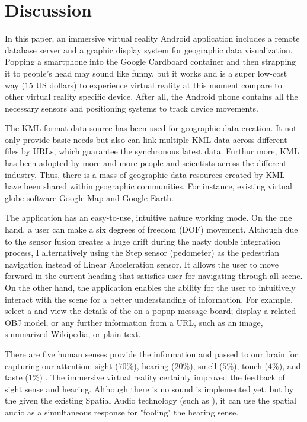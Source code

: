 \label{chapter-discussion}
\chapter{Discussion}

In this paper, an immersive virtual reality Android application includes a remote database server and a graphic display system for geographic data visualization. Popping a smartphone into the Google Cardboard container and then strapping it to people's head may sound like funny, but it works and is a super low-cost way ($15$ US dollars) to experience virtual reality at this moment compare to other virtual reality specific device. After all, the Android phone contains all the necessary sensors and positioning systems to track device movements.

The KML format data source has been used for geographic data creation. It not only provide basic needs but also can link multiple KML data across different files by URLs, which guarantee the synchronous latest data. Furthur more, KML has been adopted by more and more people and scientists across the different industry. Thus, there is a mass of geographic data resources created by KML have been shared within geographic communities. For instance, existing virtual globe software Google Map and Google Earth.

The application has an easy-to-use, intuitive nature working mode. On the one hand, a user can make a six degrees of freedom (DOF) movement. Although due to the sensor fusion creates a huge drift during the nasty double integration process, I alternatively using the Step sensor (pedometer) as the pedestrian navigation instead of Linear Acceleration sensor. It allows the user to move forward in the current heading that satisfies user for navigating through all scene. On the other hand, the application enables the ability for the user to intuitively interact with the scene for a better understanding of information. For example, select a  and view the details of the  on a popup message board; display a  related OBJ model, or any further information from a URL, such as an image, summarized Wikipedia, or plain text.

There are five human senses provide the information and passed to our brain for capturing our attention: sight ($70$\%), hearing ($20$\%), smell ($5$\%), touch ($4$\%), and taste ($1$\%) \cite{mazuryk.vr.1996}. The immersive virtual reality certainly improved the feedback of sight sense and hearing. Although there is no sound is implemented yet, but by the given the existing Spatial Audio technology (such as \cite{google.spatial-audio.2016}), it can use the spatial audio as a simultaneous response for "fooling" the hearing sense.

